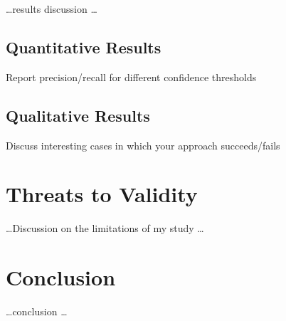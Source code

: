 \documentclass[11pt, mscthesis]{usiinfthesis}
\begin{document}
\dots results discussion \dots 

\section{Quantitative Results}
Report precision/recall for different confidence thresholds
\lipsum[1-1]

\section{Qualitative Results}
Discuss interesting cases in which your approach succeeds/fails



\chapter{Threats to Validity}

\dots Discussion on the limitations of my study \dots 


\chapter{Conclusion}

\dots conclusion \dots 


\nocite{*}
\backmatter


%
%
%
%



\printbibliography
\end{document}
